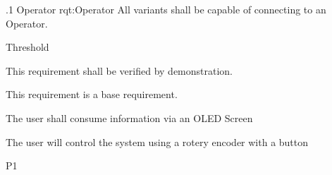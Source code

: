 \ONERQMTVKPP
{\RqtNumberBase.1}
{Operator}
{rqt:Operator}
{All \ThisSys variants shall be capable of connecting to an Operator.}
{
	\item [Phase 1] Threshold
}
{This requirement shall be verified by demonstration.}
{
	\item [N/A] This requirement is a base requirement.
}
{
  \item The user shall consume information via an OLED Screen
  \item The user will control the system using a rotery encoder with a button
}
{P1}



